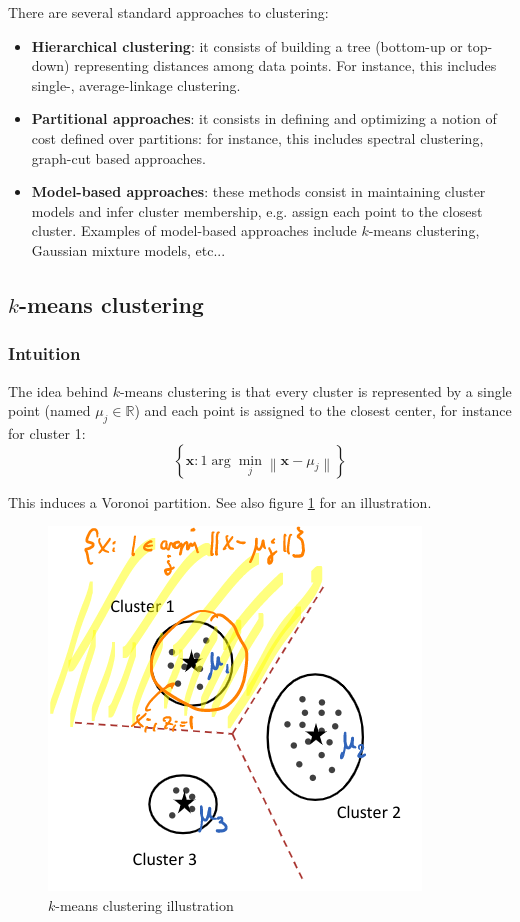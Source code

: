 \documentclass[a4paper,10pt,twoside]{article}
\newcommand\norm[1]{\left\lVert#1\right\rVert}
\begin{document}
There are several standard approaches to clustering:
\begin{itemize}
    \item \textbf{Hierarchical clustering}: it consists of building a tree (bottom-up or top-down) representing distances among data points. For instance, this includes single-, average-linkage clustering.
    \item \textbf{Partitional approaches}: it consists in defining and optimizing a notion of cost defined over partitions: for instance, this includes spectral clustering, graph-cut based approaches.
    \item \textbf{Model-based approaches}: these methods consist in maintaining cluster models and infer cluster membership, e.g. assign each point to the closest cluster. Examples of model-based approaches include $k$-means clustering, Gaussian mixture models, etc...
\end{itemize}

\subsection{$k$-means clustering}

\subsubsection{Intuition}

The idea behind $k$-means clustering is that every cluster is represented by a single point (named $\mu_j\in\mathbb{R}$) and each point is assigned to the closest center, for instance for cluster 1:
\begin{equation*}
    \left\{\mathbf{x}:1\arg\min_{j}\norm{\mathbf{x}-\mu_j}\right\}
\end{equation*}

This induces a Voronoi partition. See also figure \ref{k-means-clustering-illustration} for an illustration.


\begin{figure}
    \centering
    \includegraphics[width=.5\textwidth]{figures/k-means-clustering-illustration.png}
    \caption{$k$-means clustering illustration}
    \label{k-means-clustering-illustration}
\end{figure}
\end{document}
